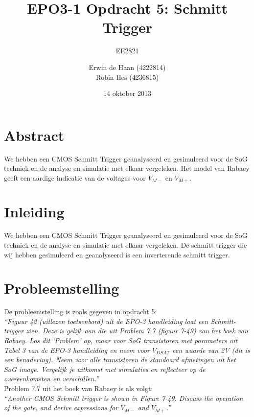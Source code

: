\documentclass{scrartcl}  %
\author{Erwin {de Haan} (4222814)  \\{Robin Hes} (4236815)}
\title{EPO3-1 Opdracht 5: Schmitt Trigger}
\subtitle{EE2821}
\date{14 oktober 2013}
\begin{document}
\maketitle
\vspace{80 mm}

\section*{Abstract}
\label{sec:trig-abstr}
We hebben een CMOS Schmitt Trigger geanalyseerd en gesimuleerd voor de SoG techniek en de analyse en simulatie met elkaar vergeleken. Het model van Rabaey geeft een aardige indicatie van de voltages voor $V_{M-}$ en $V_{M+}$.

\newpage
\setlength{\cftbeforetoctitleskip}{-3em}
\tableofcontents

\section{Inleiding}
\label{sec:trig-inl}
We hebben een CMOS Schmitt Trigger geanalyseerd en gesimuleerd voor de SoG techniek en de analyse en simulatie met elkaar vergeleken.
De schmitt trigger die wij hebben gesimuleerd en geanalyseerd is een inverterende schmitt trigger.

\newpage
{}

\section{Probleemstelling}
\label{sec:trig-prob}
De probleemstelling is zoals gegeven in opdracht 5: \\
\textit{
``Figuur 42 (uitlezen toetsenbord) uit de EPO-3 handleiding laat een Schmitt-trigger zien. Deze is gelijk
aan die uit Problem 7.7 (figuur 7-49) van het boek van Rabaey. Los dit ‘Problem’ op, maar voor SoG
transistoren met parameters uit Tabel 3 van de EPO-3 handleiding en neem voor $V_{DSAT}$ een waarde van
2V (dit is een benadering). Neem voor alle transistoren de standaard afmetingen uit het SoG image.
Vergelijk je uitkomst met simulaties en reflecteer op de overeenkomsten en verschillen.''
}
\cite[2]{epo3-opdracht-5}
\\

Problem 7.7 uit het boek van Rabaey is als volgt: \\
\textit{
``Another CMOS Schmitt trigger is shown in Figure 7-49. Discuss the operation of the gate, and derive expressions for $V_{M-}$ and $V_{M+}$.''
}
\cite[367]{rabaey-integrated-circuits}
\\
\end{document}
